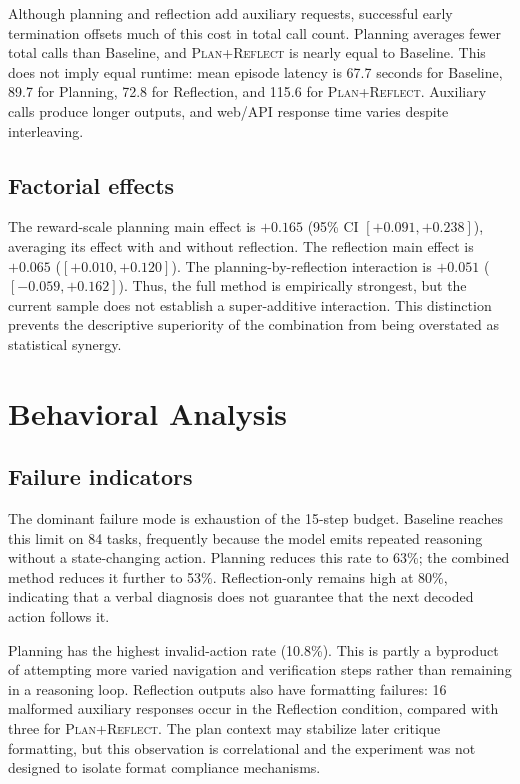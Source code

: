 \documentclass{article}
\newcommand{\method}[1]{\textsc{#1}}
\newcommand{\ours}{\method{Plan+Reflect}\xspace}
\begin{document}
Although planning and reflection add auxiliary requests, successful early termination offsets much of this cost in total call count. Planning averages fewer total calls than Baseline, and \ours is nearly equal to Baseline. This does not imply equal runtime: mean episode latency is 67.7 seconds for Baseline, 89.7 for Planning, 72.8 for Reflection, and 115.6 for \ours. Auxiliary calls produce longer outputs, and web/API response time varies despite interleaving.

\subsection{Factorial effects}

The reward-scale planning main effect is $+0.165$ (95\% CI $[+0.091,+0.238]$), averaging its effect with and without reflection. The reflection main effect is $+0.065$ ($[+0.010,+0.120]$). The planning-by-reflection interaction is $+0.051$ ($[-0.059,+0.162]$). Thus, the full method is empirically strongest, but the current sample does not establish a super-additive interaction. This distinction prevents the descriptive superiority of the combination from being overstated as statistical synergy.

\section{Behavioral Analysis}

\subsection{Failure indicators}

The dominant failure mode is exhaustion of the 15-step budget. Baseline reaches this limit on 84 tasks, frequently because the model emits repeated reasoning without a state-changing action. Planning reduces this rate to 63\%; the combined method reduces it further to 53\%. Reflection-only remains high at 80\%, indicating that a verbal diagnosis does not guarantee that the next decoded action follows it.

Planning has the highest invalid-action rate (10.8\%). This is partly a byproduct of attempting more varied navigation and verification steps rather than remaining in a reasoning loop. Reflection outputs also have formatting failures: 16 malformed auxiliary responses occur in the Reflection condition, compared with three for \ours. The plan context may stabilize later critique formatting, but this observation is correlational and the experiment was not designed to isolate format compliance mechanisms.
\end{document}
